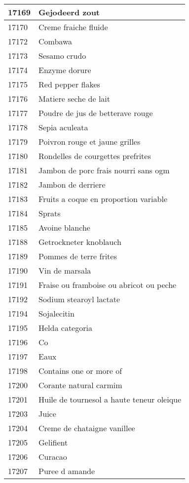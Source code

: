 \begin{longtable}{|l|l|}
17169 & Gejodeerd zout \\ \hline 
17170 & Creme fraiche fluide \\ \hline 
17172 & Combawa \\ \hline 
17173 & Sesamo crudo \\ \hline 
17174 & Enzyme dorure \\ \hline 
17175 & Red pepper flakes \\ \hline 
17176 & Matiere seche de lait \\ \hline 
17177 & Poudre de jus de betterave rouge \\ \hline 
17178 & Sepia aculeata \\ \hline 
17179 & Poivron rouge et jaune grilles \\ \hline 
17180 & Rondelles de courgettes prefrites \\ \hline 
17181 & Jambon de porc frais nourri sans ogm \\ \hline 
17182 & Jambon de derriere \\ \hline 
17183 & Fruits a coque en proportion variable \\ \hline 
17184 & Sprats \\ \hline 
17185 & Avoine blanche \\ \hline 
17188 & Getrockneter knoblauch \\ \hline 
17189 & Pommes de terre frites \\ \hline 
17190 & Vin de marsala \\ \hline 
17191 & Fraise ou framboise ou abricot ou peche \\ \hline 
17192 & Sodium stearoyl lactate \\ \hline 
17194 & Sojalecitin \\ \hline 
17195 & Helda categoria \\ \hline 
17196 & Co \\ \hline 
17197 & Eaux \\ \hline 
17198 & Contains one or more of \\ \hline 
17200 & Corante natural carmim \\ \hline 
17201 & Huile de tournesol a haute teneur oleique \\ \hline 
17203 & Juice \\ \hline 
17204 & Creme de chataigne vanillee \\ \hline 
17205 & Gelifient \\ \hline 
17206 & Curacao \\ \hline 
17207 & Puree d amande \\ \hline 

\end{longtable}
